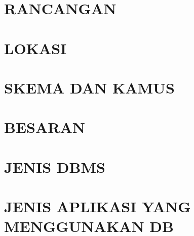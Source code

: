\documentclass[pdftex,12pt, oneside]{article}
\begin{document}
\section{RANCANGAN}


\section{LOKASI}

\section{SKEMA DAN KAMUS}

\section{BESARAN}

\section{JENIS DBMS}

\section{JENIS APLIKASI YANG MENGGUNAKAN DB}
\end{document}

